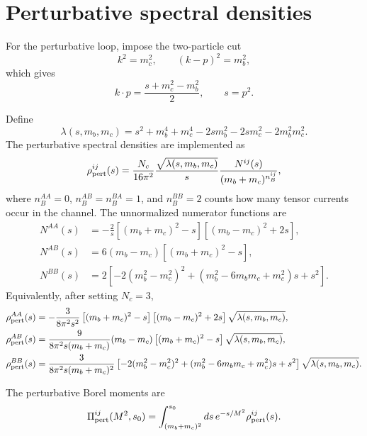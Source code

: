\documentclass[11pt]{article}
\begin{document}
\section{Perturbative spectral densities}

For the perturbative loop, impose the two-particle cut
\begin{equation}
  k^2=m_c^2,\qquad (k-p)^2=m_b^2,
\end{equation}
which gives
\begin{equation}
  k\cdot p=\frac{s+m_c^2-m_b^2}{2},
  \qquad s=p^2.
\end{equation}

Define
\begin{equation}
  \lambda(s,m_b,m_c)
  =
  s^2+m_b^4+m_c^4
  -2sm_b^2-2sm_c^2-2m_b^2m_c^2 .
\end{equation}
The perturbative spectral densities are implemented as
\begin{equation}
  \rho_{\rm pert}^{ij}(s)
  =
  \frac{N_c}{16\pi^2}
  \frac{\sqrt{\lambda(s,m_b,m_c)}}{s}
  \frac{N^{ij}(s)}{(m_b+m_c)^{n_B^{ij}}},
\end{equation}
where $n_B^{AA}=0$, $n_B^{AB}=n_B^{BA}=1$, and $n_B^{BB}=2$ counts how many
tensor currents occur in the channel.  The unnormalized numerator functions
are
\begin{align}
  N^{AA}(s)
  &=
  -\frac{2}{s}
  \left[(m_b+m_c)^2-s\right]
  \left[(m_b-m_c)^2+2s\right],
  \\
  N^{AB}(s)
  &=
  6(m_b-m_c)\left[(m_b+m_c)^2-s\right],
  \\
  N^{BB}(s)
  &=
  2\left[
    -2(m_b^2-m_c^2)^2
    +(m_b^2-6m_bm_c+m_c^2)s
    +s^2
  \right].
\end{align}
Equivalently, after setting $N_c=3$,
\begin{align}
  \rho_{\rm pert}^{AA}(s)
  &=
  -\frac{3}{8\pi^2s^2}
  \left[(m_b+m_c)^2-s\right]
  \left[(m_b-m_c)^2+2s\right]
  \sqrt{\lambda(s,m_b,m_c)},\\
  \rho_{\rm pert}^{AB}(s)
  &=
  \frac{9}{8\pi^2s(m_b+m_c)}
  (m_b-m_c)
  \left[(m_b+m_c)^2-s\right]
  \sqrt{\lambda(s,m_b,m_c)},\\
  \rho_{\rm pert}^{BB}(s)
  &=
  \frac{3}{8\pi^2s(m_b+m_c)^2}
  \left[
    -2(m_b^2-m_c^2)^2
    +(m_b^2-6m_bm_c+m_c^2)s
    +s^2
  \right]
  \sqrt{\lambda(s,m_b,m_c)}.
\end{align}

The perturbative Borel moments are
\begin{equation}
  \Pi_{\rm pert}^{ij}(M^2,s_0)
  =
  \int_{(m_b+m_c)^2}^{s_0}
  ds\,
  e^{-s/M^2}
  \rho_{\rm pert}^{ij}(s).
\end{equation}
\end{document}
